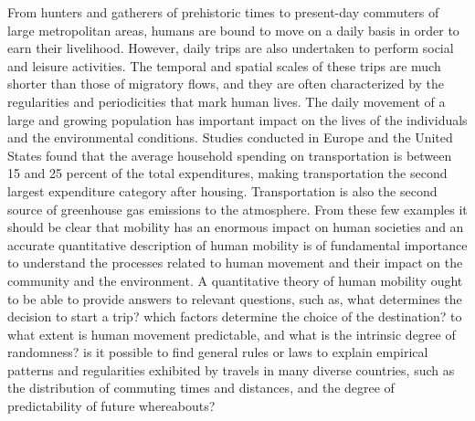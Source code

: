 From hunters and gatherers of prehistoric times to present-day commuters of large metropolitan areas, humans are bound to move on a daily basis in order to earn their livelihood. However, daily trips are also undertaken to perform social and leisure activities. 
The temporal and spatial scales of these trips are much shorter than those of migratory flows, and they are often characterized by the regularities and periodicities that mark human lives. 
The daily movement of a large and growing population has important impact on the lives of the individuals and the environmental conditions. Studies conducted in Europe and the United States found that the average household spending on transportation is between 15 and 25 percent of the total expenditures, making transportation the second largest expenditure category after housing. Transportation is also the second source of greenhouse gas emissions to the atmosphere. 
From these few examples it should be clear that mobility has an enormous impact on human societies and an accurate quantitative description of human mobility is of fundamental importance to understand the processes related to human movement and their impact on the community and the environment. 
A quantitative theory of human mobility ought to be able to provide answers to relevant questions, such as, what determines the decision to start a trip? which factors determine the choice of the destination? to what extent is human movement predictable, and what is the intrinsic degree of randomness? is it possible to find general rules or laws to explain empirical patterns and regularities exhibited by travels in many diverse countries, such as the distribution of commuting times and distances, and the degree of predictability of future whereabouts?


